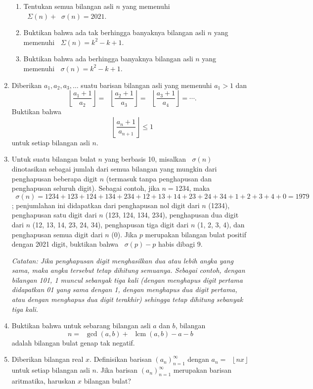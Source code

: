 \documentclass[12pt]{article}
\newcommand*\floor[1]{\mathop{}\!\left\lfloor{#1}\right\rfloor}
\newcommand*\func[2]{\mathop{}\!{#1}{\left({#2}\right)}}
\DeclareMathOperator{\lcm}{lcm}				%
\begin{document}
\begin{enumerate}[leftmargin=*]
		\begin{enumerate}
			\item Tentukan semua bilangan asli $ n $ yang memenuhi $ \func{\Sigma}{n} + \func{\sigma}{n} = 2021 $.
			\item Buktikan bahwa ada tak berhingga banyaknya bilangan asli $ n $ yang memenuhi $ \func{\Sigma}{n} = k^{2} - k + 1 $.
			\item Buktikan bahwa ada berhingga banyaknya bilangan asli $ n $ yang memenuhi $ \func{\sigma}{n} = k^{2} - k + 1 $.
		\end{enumerate}
		\item Diberikan $ a_{1}, a_{2}, a_{3}, \dots $ suatu barisan bilangan asli yang memenuhi $ a_{1} > 1 $ dan
		\[ \floor{\frac{a_{1} + 1}{a_{2}}} = \floor{\frac{a_{2} + 1}{a_{3}}} = \floor{\frac{a_{3} + 1}{a_{4}}} = \cdots. \]
		Buktikan bahwa
		\[ \floor{\frac{a_{n} + 1}{a_{n + 1}}} \leq 1 \]
		untuk setiap bilangan asli $ n $.
		\item Untuk suatu bilangan bulat $ n $ yang berbasis 10, misalkan $ \func{\sigma}{n} $ dinotasikan sebagai jumlah dari semua bilangan yang mungkin dari penghapusan beberapa digit $ n $ (termasuk tanpa penghapusan dan penghapusan seluruh digit). Sebagai contoh, jika $ n = 1234 $, maka $ \func{\sigma}{n} = 1234 + 123 + 124 + 134 + 234 + 12 + 13 + 14 + 23 + 24 + 34 + 1 + 2 + 3 + 4 + 0 = 1979 $; penjumlahan ini didapatkan dari penghapusan nol digit dari $ n $ (1234), penghapusan satu digit dari $ n $ (123, 124, 134, 234), penghapusan dua digit dari $ n $ (12, 13, 14, 23, 24, 34), penghapusan tiga digit dari $ n $ (1, 2, 3, 4), dan penghapusan semua digit dari $ n $ (0). Jika $ p $ merupakan bilangan bulat positif dengan 2021 digit, buktikan bahwa $ \func{\sigma}{p} - p $ habis dibagi 9.
		\par \noindent \textit{Catatan: Jika penghapusan digit menghasilkan dua atau lebih angka yang sama, maka angka tersebut tetap dihitung semuanya. Sebagai contoh, dengan bilangan 101, 1 muncul sebanyak tiga kali (dengan menghapus digit pertama didapatkan 01 yang sama dengan 1, dengan menghapus dua digit pertama, atau dengan menghapus dua digit terakhir) sehingga tetap dihitung sebanyak tiga kali.}
		\item Buktikan bahwa untuk sebarang bilangan asli $ a $ dan $ b $, bilangan
		\[ n = \func{\gcd}{a, b} + \func{\lcm}{a, b} - a - b \]
		adalah bilangan bulat genap tak negatif.
		\item Diberikan bilangan real $ x $. Definisikan barisan $ \left(a_{n}\right)_{n = 1}^{\infty} $ dengan $ a_{n} = \floor{nx} $ untuk setiap bilangan asli $ n $. Jika barisan $ \left(a_{n}\right)_{n = 1}^{\infty} $ merupakan barisan aritmatika, haruskan $ x $ bilangan bulat?

\end{enumerate}
\end{document}
